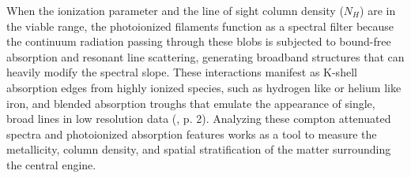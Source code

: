 \documentclass{aa} %
\begin{document}
When the ionization parameter and the line of sight column density ($N_H$) are in the viable range, the photoionized filaments function as a spectral filter because the continuum radiation passing through these blobs is subjected to bound-free absorption and resonant line scattering, generating broadband structures that can heavily modify the spectral slope. These interactions manifest as K-shell absorption edges from highly ionized species, such as hydrogen like or helium like iron, and blended absorption troughs that emulate the appearance of single, broad lines in low resolution data (\citet{Haileyetal1999}, p. 2). Analyzing these compton attenuated spectra and photoionized absorption features works as a tool to measure the metallicity, column density, and spatial stratification of the matter surrounding the central engine.
\end{document}
